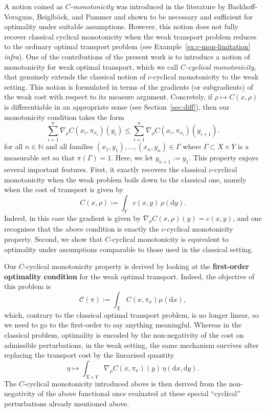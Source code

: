 \documentclass[leqno, 11pt, a4paper]{amsart}
\theoremstyle{definition}
\newcommand{\C}{\mathscr{C}}
\newcommand{\N}{\mathbb{N}}
\newcommand{\dd}{\mathrm{d}}
\begin{document}
A notion coined as \textit{$C$-monotonicity} was introduced in the literature by Backhoff-Veraguas, Beiglb\"ock, and Pammer \cite{backhoff-veraguasExistenceDualityCyclical2019} and shown to be necessary and sufficient for optimality under suitable assumptions. However, this notion does not fully recover classical cyclical monotonicity when the weak transport problem reduces to the ordinary optimal transport problem (see Example~\ref{ex:c-mon-limitation} \textit{infra}). One of the contributions of the present work is to introduce a notion of monotonicity for weak optimal transport, which we call \textit{$C$-cyclical monotonicity}, that genuinely extends the classical notion of $c$-cyclical monotonicity to the weak setting. This notion is formulated in terms of the gradients (or subgradients) of the weak cost with respect to its measure argument. Concretely, if $\rho\mapsto C(x,\rho)$ is differentiable in an appropriate sense (see Section~\ref{sec:diff}), then our monotonicity condition takes the form
$$
\boxed{\sum_{i=1}^n \nabla_\rho C(x_i,\pi_{x_i})(y_i) \leq \sum_{i=1}^n \nabla_\rho C(x_i,\pi_{x_i})(y_{i+1}).}
$$
for all $n \in \N$ and all families $(x_1, y_1), \dots, (x_n, y_n) \in \Gamma$ where $\Gamma \subset X \times Y$ is a measurable set so that $\pi(\Gamma) =1$. Here, we let $y_{n+1} := y_1$. This property enjoys several important features.  First, it exactly recovers the classical $c$-cyclical monotonicity when the weak problem boils down to the classical one, namely when the cost of transport is given by
$$
C(x,\rho) :=\int_Y c(x,y)\,\rho(\dd y).
$$
Indeed, in this case the gradient is given by $\nabla_\rho C(x,\rho)(y)=c(x,y)$, and one recognises that the above condition is exactly the $c$-cyclical monotonicity property. Second, we show that $C$-cyclical monotonicity is equivalent to optimality under assumptions comparable to those used in the classical setting. 

Our $C$-cyclical monotonicity property is derived by looking at the \textbf{first-order optimality condition} for the weak optimal transport. Indeed, the objective of this problem is
$$
\C(\pi) := \int_{X} C(x, \pi_x) \mu(\dd x),
$$
which, contrary to the classical optimal transport problem, is no longer linear, so we need to go to the first-order to say anything meaningful. Whereas in the classical problem, optimality is encoded by the non-negativity of the cost on admissible perturbations, in the weak setting, the same mechanism survives after replacing the transport cost by the linearised quantity
$$
\eta\mapsto \int_{X\times Y} \nabla_\rho C(x,\pi_x)(y)\,\eta(\dd x,\dd y).
$$
The $C$-cyclical monotonicity introduced above is then derived from the non-negativity of the above functional once evaluated at these special ``cyclical'' perturbations already mentioned above. 
\end{document}
